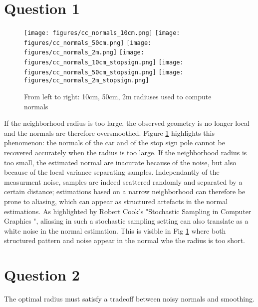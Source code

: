 \documentclass[a4paper]{article}
\begin{document}





\section*{Question 1}
\begin{figure}[ht]
  \centering
  \texttt{[image: figures/cc\_normals\_10cm.png]}
  \texttt{[image: figures/cc\_normals\_50cm.png]}
  \texttt{[image: figures/cc\_normals\_2m.png]}
  \texttt{[image: figures/cc\_normals\_10cm\_stopsign.png]}
  \texttt{[image: figures/cc\_normals\_50cm\_stopsign.png]}
  \texttt{[image: figures/cc\_normals\_2m\_stopsign.png]}
  \caption{From left to right: 10cm, 50cm, 2m radiuses used to compute normals}
  \label{fig:cc_normals}
\end{figure}
If the neighborhood radius is too large, the observed geometry is no longer local and the normals are therefore oversmoothed.
Figure \ref{fig:cc_normals} highlights this phenomenon: the normals of the car and of the stop sign pole cannot be recovered accurately when the radius is too large.
If the neighborhood radius is too small, the estimated normal are inacurate because of the noise, but also because of the local variance separating samples.
Independantly of the measurment noise, samples are indeed scattered randomly and separated by a certain distance; estimations based on a narrow neighborhood can therefore
be prone to aliasing, which can appear as structured artefacts in the normal estimations. As highlighted by Robert Cook's "Stochastic Sampling in Computer Graphics 
", aliasing in such a stochastic sampling setting can also translate as a white noise in the normal estimation. This is visible in Fig \ref{fig:cc_normals} where both structured pattern
and noise appear in the normal whe the radius is too short.



\section*{Question 2}
The optimal radius must satisfy a tradeoff between noisy normals and smoothing.
\end{document}
